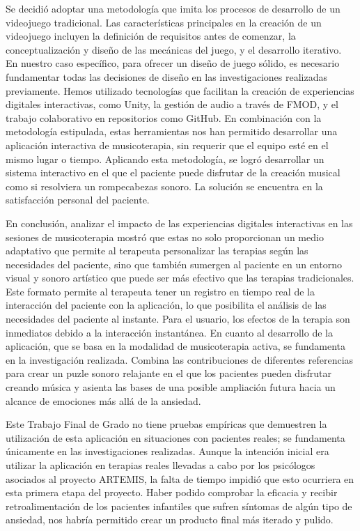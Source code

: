 Se decidió adoptar una metodología que imita los procesos de desarrollo de un videojuego tradicional. Las características principales en la creación de un videojuego incluyen la definición de requisitos antes de comenzar, la conceptualización y diseño de las mecánicas del juego, y el desarrollo iterativo. En nuestro caso específico, para ofrecer un diseño de juego sólido, es necesario fundamentar todas las decisiones de diseño en las investigaciones realizadas previamente. Hemos utilizado tecnologías que facilitan la creación de experiencias digitales interactivas, como Unity, la gestión de audio a través de FMOD, y el trabajo colaborativo en repositorios como GitHub. En combinación con la metodología estipulada, estas herramientas nos han permitido desarrollar una aplicación interactiva de musicoterapia, sin requerir que el equipo esté en el mismo lugar o tiempo. Aplicando esta metodología, se logró desarrollar un sistema interactivo en el que el paciente puede disfrutar de la creación musical como si resolviera un rompecabezas sonoro. La solución se encuentra en la satisfacción personal del paciente.

En conclusión, analizar el impacto de las experiencias digitales interactivas en las sesiones de musicoterapia mostró que estas no solo proporcionan un medio adaptativo que permite al terapeuta personalizar las terapias según las necesidades del paciente, sino que también sumergen al paciente en un entorno visual y sonoro artístico que puede ser más efectivo que las terapias tradicionales. Este formato permite al terapeuta tener un registro en tiempo real de la interacción del paciente con la aplicación, lo que posibilita el análisis de las necesidades del paciente al instante. Para el usuario, los efectos de la terapia son inmediatos debido a la interacción instantánea. En cuanto al desarrollo de la aplicación, que se basa en la modalidad de musicoterapia activa, se fundamenta en la investigación realizada. Combina las contribuciones de diferentes referencias para crear un puzle sonoro relajante en el que los pacientes pueden disfrutar creando música y asienta las bases de una posible ampliación futura hacia un alcance de emociones más allá de la ansiedad.

Este Trabajo Final de Grado no tiene pruebas empíricas que demuestren la utilización de esta aplicación en situaciones con pacientes reales; se fundamenta únicamente en las investigaciones realizadas. Aunque la intención inicial era utilizar la aplicación en terapias reales llevadas a cabo por los psicólogos asociados al proyecto ARTEMIS, la falta de tiempo impidió que esto ocurriera en esta primera etapa del proyecto. Haber podido comprobar la eficacia y recibir retroalimentación de los pacientes infantiles que sufren síntomas de algún tipo de ansiedad, nos habría permitido crear un producto final más iterado y pulido.

